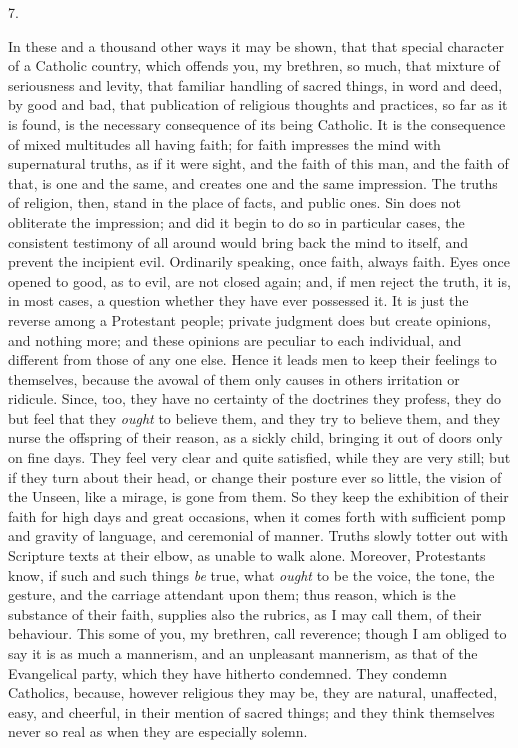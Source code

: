 7.

In these and a thousand other ways it may be shown, that that
special character of a Catholic country, which offends you, my
brethren, so much, that mixture of seriousness and levity, that
familiar handling of sacred things, in word and deed, by good and bad,
that publication of religious thoughts and practices, so far as it is
found, is the necessary consequence of its being Catholic. It is the
consequence of mixed multitudes all having faith; for faith impresses
the mind with supernatural truths, as if it were sight, and the faith
of this man, and the faith of that, is one and the same, and creates
one and the same impression. The truths of religion, then, stand in
the place of facts, and public ones. Sin does not obliterate the
impression; and did it begin to do so in particular cases, the
consistent testimony of all around would bring back the mind to
itself, and prevent the incipient evil. Ordinarily speaking, once
faith, always faith. Eyes once opened to good, as to evil, are not
closed again; and, if men reject the truth, it is, in most cases, a
question whether they have ever possessed it. It is just the reverse
among a Protestant people; private judgment does but create opinions,
and nothing more; and these opinions are peculiar to each individual,
and different from those of any one else. Hence it leads men to keep
their feelings to themselves, because the avowal of them only causes
in others irritation or ridicule. Since, too, they have no certainty
of the doctrines they profess, they do but feel that they \emph{ought} to
believe them, and they try to believe them, and they nurse the
offspring of their reason, as a sickly child, bringing it out of doors
only on fine days. They feel very clear and quite satisfied, while
they are very still; but if they turn about their head, or change
their posture ever so little, the vision of the Unseen, like a mirage,
is gone from them. So they keep the exhibition of their faith for high
days and great occasions, when it comes forth with sufficient pomp and
gravity of language, and ceremonial of manner. Truths slowly totter
out with Scripture texts at their elbow, as unable to walk alone.
Moreover, Protestants know, if such and such things \emph{be} true, what
\emph{ought} to be the voice, the tone, the gesture, and the carriage
attendant upon them; thus reason, which is the substance of their
faith, supplies also the rubrics, as I may call them, of their
behaviour. This some of you, my brethren, call reverence; though I am
obliged to say it is as much a mannerism, and an unpleasant mannerism,
as that of the Evangelical party, which they have hitherto condemned.
They condemn Catholics, because, however religious they may be, they
are natural, unaffected, easy, and cheerful, in their mention of
sacred things; and they think themselves never so real as when they
are especially solemn.

